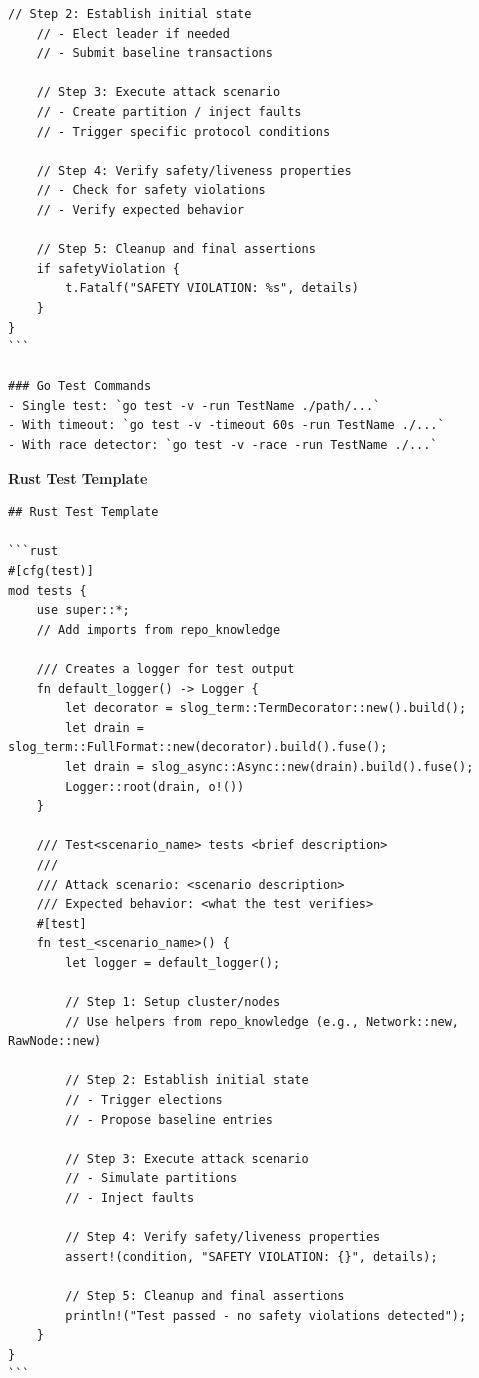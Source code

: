 \documentclass{article}
\theoremstyle{plain}
\theoremstyle{definition}
\theoremstyle{remark}
\begin{document}
\begin{agentbox}
{\begin{Verbatim}[fontsize=\scriptsize]
    // Step 2: Establish initial state
    // - Elect leader if needed
    // - Submit baseline transactions
    
    // Step 3: Execute attack scenario
    // - Create partition / inject faults
    // - Trigger specific protocol conditions
    
    // Step 4: Verify safety/liveness properties
    // - Check for safety violations
    // - Verify expected behavior
    
    // Step 5: Cleanup and final assertions
    if safetyViolation {
        t.Fatalf("SAFETY VIOLATION: %s", details)
    }
}
```

### Go Test Commands
- Single test: `go test -v -run TestName ./path/...`
- With timeout: `go test -v -timeout 60s -run TestName ./...`
- With race detector: `go test -v -race -run TestName ./...`
    \end{Verbatim}
    \textbf{Rust Test Template}
    
    \begin{Verbatim}[fontsize=\scriptsize]
## Rust Test Template

```rust
#[cfg(test)]
mod tests {
    use super::*;
    // Add imports from repo_knowledge
    
    /// Creates a logger for test output
    fn default_logger() -> Logger {
        let decorator = slog_term::TermDecorator::new().build();
        let drain = slog_term::FullFormat::new(decorator).build().fuse();
        let drain = slog_async::Async::new(drain).build().fuse();
        Logger::root(drain, o!())
    }
    
    /// Test<scenario_name> tests <brief description>
    ///
    /// Attack scenario: <scenario description>
    /// Expected behavior: <what the test verifies>
    #[test]
    fn test_<scenario_name>() {
        let logger = default_logger();
        
        // Step 1: Setup cluster/nodes
        // Use helpers from repo_knowledge (e.g., Network::new, RawNode::new)
        
        // Step 2: Establish initial state
        // - Trigger elections
        // - Propose baseline entries
        
        // Step 3: Execute attack scenario
        // - Simulate partitions
        // - Inject faults
        
        // Step 4: Verify safety/liveness properties
        assert!(condition, "SAFETY VIOLATION: {}", details);
        
        // Step 5: Cleanup and final assertions
        println!("Test passed - no safety violations detected");
    }
}
```


\end{Verbatim}}
\end{agentbox}
\end{document}
